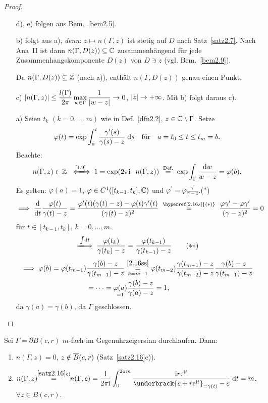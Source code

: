 \documentclass[a4paper,twoside,DIV15,BCOR12mm]{scrbook}
\begin{document}
\begin{proof}\begin{itemize}
\item[d),]e) folgen aus Bem.~\ref{bem2.5}.

\item[b)] folgt aus a), \textit{denn}: $z\mapsto n(\Gamma,z)$ ist stetig auf $D$ nach Satz~\ref{satz2.7}. Nach Ana~II ist dann $n(\Gamma,D(z))\subseteq\mathbb{C}$ zusammenhängend für jede Zusammenhangskomponente $D(z)$ von $D\ni z$ (vgl. Bem.~\ref{bem2.9}).

Da $n(\Gamma,D(z))\subseteq\mathbb{Z}$ (nach a)), enthält $n(\Gamma,D(z))$ genau einen Punkt.

\item[c)] $\displaystyle\left\lvert n(\Gamma,z)\right\lvert\leq\frac{l(\Gamma)}{2\pi}\max_{w\in\Gamma}\frac{1}{\left\lvert w-z\right\lvert}\rightarrow 0$, $\left\lvert z\right\lvert\rightarrow+\infty$. Mit b) folgt daraus c).

\item[a)] Seien $t_k$ $(k=0,\dotsc,m)$ wie in Def.~\ref{dfn2.2}, $z\in\mathbb{C}\setminus\Gamma$. Setze 
\[\varphi(t) = \exp\int_{a}^{t}{\frac{\gamma^\prime(s)}{\gamma(s)-z}}\;\mathrm{d} s\quad\text{für}\quad a = t_0\leq t\leq t_m = b.\]
Beachte:
\[n(\Gamma,z)\in\set{Z}\gdwnach{\eqref{1.9}} 1 = \exp(2\pi\i\cdot n(\Gamma,z)) \nach{=}{Def.} \exp\int_\Gamma\frac{\d w}{w-z} = \varphi(b).\]
Es gelten: $\varphi(a) = 1$, $\varphi\in C^1([t_{k-1},t_k],\mathbb{C})$ und $\varphi^\prime = \varphi\frac{\gamma^\prime}{\gamma-z}$.\label{2.16s}\hfill($*$)
\[\folgt \frac{\d}{\d t}\frac{\varphi(t)}{\gamma(t) - z} = \frac{\varphi^\prime(t)(\gamma(t)-z)-\varphi(t)\gamma^\prime(t)}{(\gamma(t)-z)^2} \wegen{=}{\hyperref[2.16s]{(*)}} \frac{\varphi\gamma^\prime-\varphi\gamma^\prime}{(\gamma-z)^2} = 0\]
für $t\in[t_{k-1},t_k]$, $k=0,\dotsc,m$.
\[\label{2.16ss}\folgtwegen{\int\!\d t}\frac{\varphi(t_k)}{\gamma(t_k)-z} = \frac{\varphi(t_{k-1})}{\gamma(t_{k-1})-z}\tag{$**$}\]
\begin{align*}
\implies\varphi(b)=\varphi(t_{m-1})&\frac{\gamma(b)-z}{\gamma(t_{m-1})-z} \overset{\eqref{2.16ss}}{\underset{k=m-1}{=}} \varphi(t_{m-2})\frac{\gamma(t_{m-1})-z}{\gamma(t_{m-2})-z}\frac{\gamma(b)-z}{\gamma(t_{m-1})-z}\\& = \dotsb = \underset{=1}{\varphi(a)}\frac{\gamma(b)-z}{\gamma(a)-z} = 1,
\end{align*}
da $\gamma(a) = \gamma(b)$, da $\Gamma$ geschlossen.\qedhere
\end{itemize}
\end{proof}

\begin{bsp}\label{bsp2.17}
Sei $\Gamma = \partial B(c,r)$ $m$-fach im Gegenuhrzeigersinn durchlaufen. Dann:
\begin{enumerate}
\item $n(\Gamma,z) = 0$, $z\notin \overline{B}(c,r)$ (Satz~\ref{satz2.16}c)).
\item $\displaystyle n(\Gamma,z)\!\! \overset{\ref{satz2.16}c)}{=}\!\! n(\Gamma,c) = \frac{1}{2\pi\i}\integral{0}{2\pi m}{\frac{\i r\e^{\i t}}{\underbrack{c+r\e^{\i t}}_{=\gamma(t)}-c}}{t} = m$, $\forall z\in B(c,r)$.
\end{enumerate}
\end{bsp}
\end{document}
